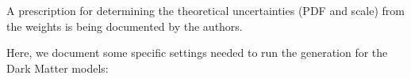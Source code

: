 
A prescription for determining the theoretical uncertainties (PDF and scale) from the \powheg weights is being documented by the \powheg authors.

Here, we document some specific settings needed to run the \powheg 
generation for the Dark Matter models: 











